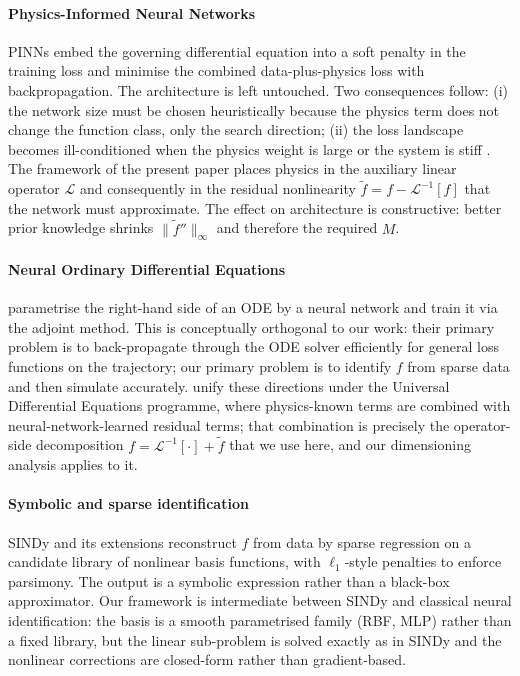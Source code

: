 \documentclass[preprint,12pt,numbers]{elsarticle}
\begin{document}
\paragraph{Physics-Informed Neural Networks} PINNs
\cite{Raissi2019,KarniadakisEtAl2021} embed the governing differential
equation into a soft penalty in the training loss and minimise the
combined data-plus-physics loss with backpropagation. The architecture
is left untouched. Two consequences follow: (i) the network size must
be chosen heuristically because the physics term does not change the
function class, only the search direction; (ii) the loss landscape
becomes ill-conditioned when the physics weight is large or the system
is stiff \cite{WangPerdikaris2021,Krishnapriyan2021}. The framework of
the present paper places physics in the auxiliary linear operator
$\mathcal{L}$ and consequently in the residual nonlinearity
$\tilde{f} = f - \mathcal{L}^{-1}[f]$ that the network must approximate.
The effect on architecture is constructive: better prior knowledge
shrinks $\|\tilde{f}''\|_\infty$ and therefore the required $M$.

\paragraph{Neural Ordinary Differential Equations} \citet{ChenEtAl2018}
parametrise the right-hand side of an ODE by a neural network and train
it via the adjoint method. This is conceptually orthogonal to our work:
their primary problem is to back-propagate through the ODE solver
efficiently for general loss functions on the trajectory; our primary
problem is to identify $f$ from sparse data and then simulate accurately.
\citet{Rackauckas2020} unify these directions under the Universal
Differential Equations programme, where physics-known terms are
combined with neural-network-learned residual terms; that combination
is precisely the operator-side decomposition $f = \mathcal{L}^{-1}[\cdot] + \tilde{f}$
that we use here, and our dimensioning analysis applies to it.

\paragraph{Symbolic and sparse identification} SINDy
\cite{BruntonProctorKutz2016} and its extensions
\cite{Champion2019,Kaheman2020} reconstruct $f$ from data by sparse
regression on a candidate library of nonlinear basis functions, with
$\ell_1$-style penalties to enforce parsimony. The output is a symbolic
expression rather than a black-box approximator. Our framework is
intermediate between SINDy and classical neural identification: the
basis is a smooth parametrised family (RBF, MLP) rather than a fixed
library, but the linear sub-problem is solved exactly as in SINDy and
the nonlinear corrections are closed-form rather than gradient-based.
\end{document}
